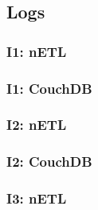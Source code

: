 \subsection{Logs}
\label{appendix:logs}

\subsubsection*{I1: nETL}
\subsubsection*{I1: CouchDB}

\subsubsection*{I2: nETL}
\subsubsection*{I2: CouchDB}

\subsubsection*{I3: nETL}
